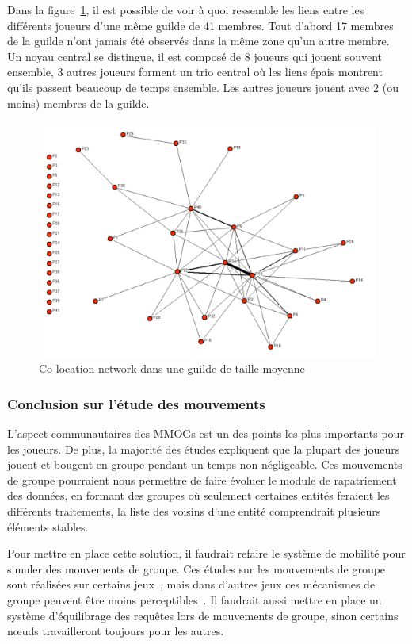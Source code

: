\par Dans la figure~\ref{co-location}, il est possible de voir à quoi ressemble les liens entre les différents joueurs d'une même guilde de 41 membres. Tout d'abord 17 membres de la guilde n'ont jamais été observés dans la même zone qu'un autre membre. Un noyau central se distingue, il est composé de 8 joueurs qui jouent souvent ensemble, 3 autres joueurs forment un trio central où les liens épais montrent qu'ils passent beaucoup de temps ensemble. Les autres joueurs jouent avec 2 (ou moins) membres de la guilde.
	 \begin{figure}[!h]
        \centering
        \includegraphics[scale=0.75]{./Ressources/Images/co-location.png}
        \caption{Co-location network dans une guilde de taille moyenne}
        \label{co-location}
        \end{figure}

\subsubsection{Conclusion sur l'étude des mouvements}
L'aspect communautaires des MMOGs est un des points les plus importants pour les joueurs. De plus, la majorité des études expliquent que la plupart des joueurs jouent et bougent en groupe pendant un temps non négligeable. Ces mouvements de groupe pourraient nous permettre de faire évoluer le module de rapatriement des données, en formant des groupes où seulement certaines entités feraient les différents traitements, la liste des voisins d'une entité comprendrait plusieurs éléments stables.
\par Pour mettre en place cette solution, il faudrait refaire le système de mobilité pour simuler des mouvements de groupe. Ces études sur les mouvements de groupe sont réalisées sur certains jeux~\cite{wow,everquest}, mais dans d'autres jeux ces mécanismes de groupe peuvent être moins perceptibles~\cite{sl}. Il faudrait aussi mettre en place un système d'équilibrage des requêtes lors de mouvements de groupe, sinon certains nœuds travailleront toujours pour les autres.


